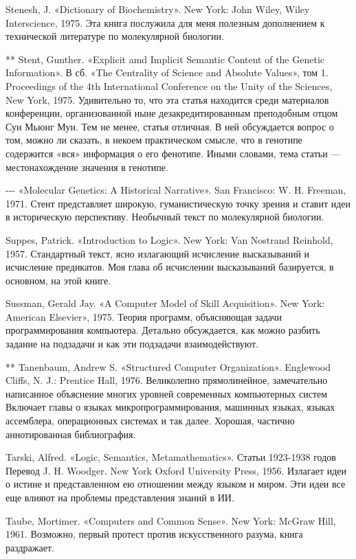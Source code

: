 Stenesh, J. «Dictionary of Biochemistry». New York: John Wiley, Wiley Interscience, 1975. Эта книга послужила для меня полезным дополнением к технической литературе по молекулярной биологии.

** Stent, Gunther. «Explicit amd Implicit Semantic Content of the Genetic Information». В сб. «The Centrality of Science and Absolute Values», том 1. Proceedings of the 4th International Conference on the Unity of the Sciences, New York, 1975. Удивительно то, что эта статья находится среди материалов конференции, организованной ныне дезакредитированным преподобным отцом Сун Мьюнг Мун. Тем не менее, статья отличная. В ней обсуждается вопрос о том, можно ли сказать, в некоем практическом смысле, что в генотипе содержится «вся» информация о его фенотипе. Иными словами, тема статьи --- местонахождение значения в генотипе.

-\/-\/- «Molecular Genetics: A Historical Narrative». San Francisco: W. H. Freeman, 1971. Стент представляет широкую, гуманистическую точку зрения и ставит идеи в историческую перспективу. Необычный текст по молекулярной биологии.

Suppes, Patrick. «Introduction to Logic». New York: Van Nostrand Reinhold, 1957. Стандартный текст, ясно излагающий исчисление высказываний и исчисление предикатов. Моя глава об исчислении высказываний базируется, в основном, на этой книге.

Sussman, Gerald Jay. «A Computer Model of Skill Acquisition». New York: American Elsevier», 1975. Теория программ, объясняющая задачи программирования компьютера. Детально обсуждается, как можно разбить задание на подзадачи и как эти подзадачи взаимодействуют.

** Tanenbaum, Andrew S. «Structured Computer Organization». Englewood Cliffs, N. J.: Prentice Hall, 1976. Великолепно прямолинейное, замечательно написанное объяснение многих уровней современных компьютерных систем Включает главы о языках микропрограммирования, машинных языках, языках ассемблера, операционных системах и так далее. Хорошая, частично аннотированная библиография.

Tarski, Alfred. «Logic, Semantics, Metamathematics». Статьи 1923-1938 годов Перевод J. H. Woodger. New York Oxford University Press, 1956. Излагает идеи о истине и представленном ею отношении между языком и миром. Эти идеи все еще влияют на проблемы представления знаний в ИИ.

Taube, Mortimer. «Computers and Common Sense». New York: McGraw Hill, 1961. Возможно, первый протест против искусственного разума, книга раздражает.

